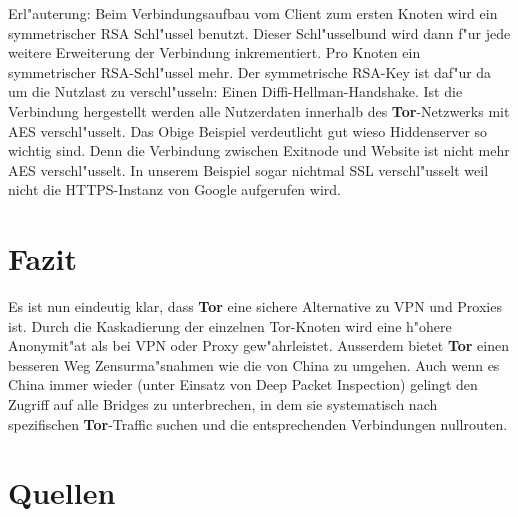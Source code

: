 \documentclass[titlepage]{article}
\begin{document}
Erl"auterung: Beim Verbindungsaufbau vom Client zum ersten Knoten wird ein symmetrischer RSA Schl"ussel benutzt. Dieser Schl"usselbund wird dann f"ur jede weitere Erweiterung der Verbindung inkrementiert. Pro Knoten ein symmetrischer RSA-Schl"ussel mehr. Der symmetrische RSA-Key ist daf"ur da um die Nutzlast zu verschl"usseln: Einen Diffi-Hellman-Handshake. Ist die Verbindung hergestellt werden alle Nutzerdaten innerhalb des \textbf{Tor}-Netzwerks mit AES verschl"usselt. \cite{design} Das Obige Beispiel verdeutlicht gut wieso Hiddenserver so wichtig sind. Denn die Verbindung zwischen Exitnode und Website ist nicht mehr AES verschl"usselt. In unserem Beispiel sogar nichtmal SSL verschl"usselt weil nicht die HTTPS-Instanz von Google aufgerufen wird.

\newpage
\section{Fazit}
Es ist nun eindeutig klar, dass \textbf{Tor} eine sichere Alternative zu VPN und Proxies ist.
Durch die Kaskadierung der einzelnen Tor-Knoten wird eine h"ohere Anonymit"at als bei VPN oder Proxy gew"ahrleistet. Ausserdem bietet \textbf{Tor} einen besseren Weg Zensurma"snahmen wie die von China zu umgehen. Auch wenn es China immer wieder (unter Einsatz von Deep Packet Inspection) gelingt den Zugriff auf alle Bridges zu unterbrechen, in dem sie systematisch nach spezifischen \textbf{Tor}-Traffic suchen und die entsprechenden Verbindungen nullrouten. 
\newpage
\section{Quellen}
\nocite{*}


\listoffigures
\end{document}
